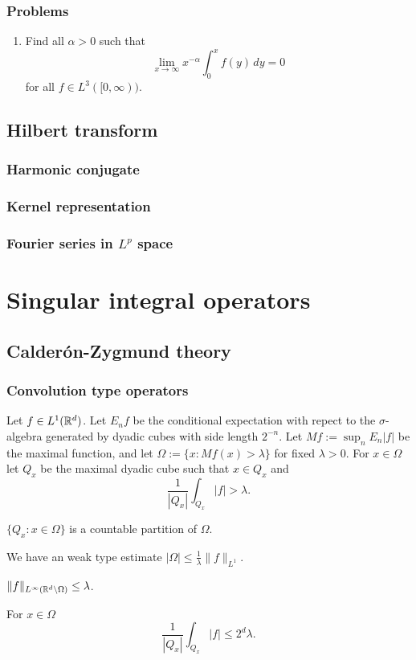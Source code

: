 \documentclass{../../large}
\begin{document}
\section*{Problems}
\begin{enumerate}
\item Find all $\alpha>0$ such that
\[\lim_{x\to\infty}x^{-\alpha}\int_0^xf(y)\,dy=0\]
for all $f\in L^3([0,\infty))$.
\end{enumerate}








\chapter{Hilbert transform}

\section{Harmonic conjugate}
\section{Kernel representation}
\section{Fourier series in $L^p$ space}









\part{Singular integral operators}
\chapter{Calder\'on-Zygmund theory}


\section{Convolution type operators}
\begin{prb}
Let $f\in L^1(\mathbb{R}^d)$.
Let $E_nf$ be the conditional expectation with repect to the $\sigma$-algebra generated by dyadic cubes with side length $2^{-n}$.
Let $Mf:=\sup_nE_n|f|$ be the maximal function, and let $\Omega:=\{x:Mf(x)>\lambda\}$ for fixed $\lambda>0$.
For $x\in\Omega$ let $Q_x$ be the maximal dyadic cube such that $x\in Q_x$ and
\[\frac1{|Q_x|}\int_{Q_x}|f|>\lambda.\]
\begin{parts}
\item
$\{Q_x:x\in\Omega\}$ is a countable partition of $\Omega$.
\item
We have an weak type estimate $|\Omega|\le\frac1\lambda\|f\|_{L^1}$.
\item
$\|f\|_{L^\infty(\mathbb{R}^d\setminus\Omega)}\le\lambda$.
\item
For $x\in\Omega$
\[\frac1{|Q_x|}\int_{Q_x}|f|\le2^d\lambda.\]
\end{parts}
\end{prb}
\end{document}
